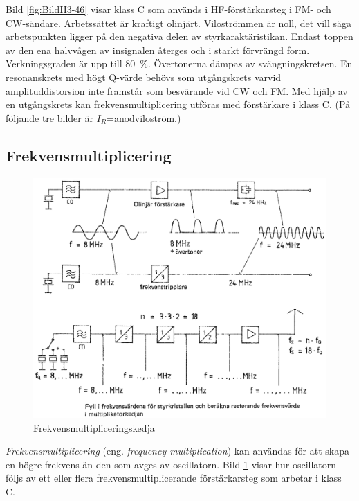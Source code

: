 Bild \ref{fig:BildII3-46} visar klass C som används i HF-förstärkarsteg i
FM- och CW-sändare.
Arbetssättet är kraftigt olinjärt.
Viloströmmen är noll, det vill säga arbetspunkten ligger på den negativa delen
av styrkaraktäristikan.
Endast toppen av den ena halvvågen av insignalen återges och i starkt
förvrängd form.
Verkningsgraden är upp till 80~\%.
Övertonerna dämpas av svängningskretsen.
En resonanskrets med högt Q-värde behövs som utgångskrets varvid
amplituddistorsion inte framstår som besvärande vid CW och FM.
Med hjälp av en utgångskrets kan frekvensmultiplicering utföras med
förstärkare i klass C.
(På följande tre bilder är \(I_R\)=anodviloström.)

\subsection{Frekvensmultiplicering}

\begin{figure}
\includegraphics[width=\textwidth]{images/cropped_pdfs/bild_2_3-47.pdf}
\caption{Frekvensmultipliceringskedja}
\label{fig:BildII3-47}
\end{figure}

\emph{Frekvensmultiplicering} (eng. \emph{frequency multiplication}) kan
användas för att skapa en högre frekvens än den som avges av oscillatorn.
Bild \ref{fig:BildII3-47} visar hur oscillatorn följs av ett eller flera
frekvensmultiplicerande förstärkarsteg som arbetar i klass C.


